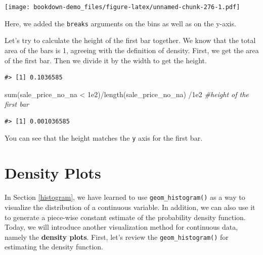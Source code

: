 \documentclass[
]{book}
\newenvironment{Shaded}{\begin{snugshade}}{\end{snugshade}}
\newcommand{\CommentTok}[1]{\textcolor[rgb]{0.56,0.35,0.01}{\textit{#1}}}
\newcommand{\FloatTok}[1]{\textcolor[rgb]{0.00,0.00,0.81}{#1}}
\newcommand{\FunctionTok}[1]{\textcolor[rgb]{0.00,0.00,0.00}{#1}}
\newcommand{\NormalTok}[1]{#1}
\newcommand{\OtherTok}[1]{\textcolor[rgb]{0.56,0.35,0.01}{#1}}
\newcommand{\SpecialCharTok}[1]{\textcolor[rgb]{0.00,0.00,0.00}{#1}}
\begin{document}
\texttt{[image: bookdown-demo\_files/figure-latex/unnamed-chunk-276-1.pdf]}

Here, we added the \texttt{breaks} arguments on the bins as well as on the y-axis.

Let's try to calculate the height of the first bar together. We know that the total area of the bars is 1, agreeing with the definition of density. First, we get the area of the first bar. Then we divide it by the width to get the height.

\begin{Shaded}
\end{Shaded}

\begin{verbatim}
#> [1] 0.1036585
\end{verbatim}

\begin{Shaded}
\begin{Highlighting}[]
\FunctionTok{sum}\NormalTok{(sale\_price\_no\_na }\SpecialCharTok{\textless{}} \FloatTok{1e2}\NormalTok{)}\SpecialCharTok{/}\FunctionTok{length}\NormalTok{(sale\_price\_no\_na) }\SpecialCharTok{/}\FloatTok{1e2} \CommentTok{\#height of the first bar}
\end{Highlighting}
\end{Shaded}

\begin{verbatim}
#> [1] 0.001036585
\end{verbatim}

You can see that the height matches the \texttt{y} axis for the first bar.

\hypertarget{density-plot}{%
\section{Density Plots}\label{density-plot}}

In Section \ref{histogram}, we have learned to use \texttt{geom\_histogram()} as a way to visualize the distribution of a continuous variable. In addition, we can also use it to generate a piece-wise constant estimate of the probability density function. Today, we will introduce another visualization method for continuous data, namely the \textbf{density plots}. First, let's review the \texttt{geom\_histogram()} for estimating the density function.
\end{document}
